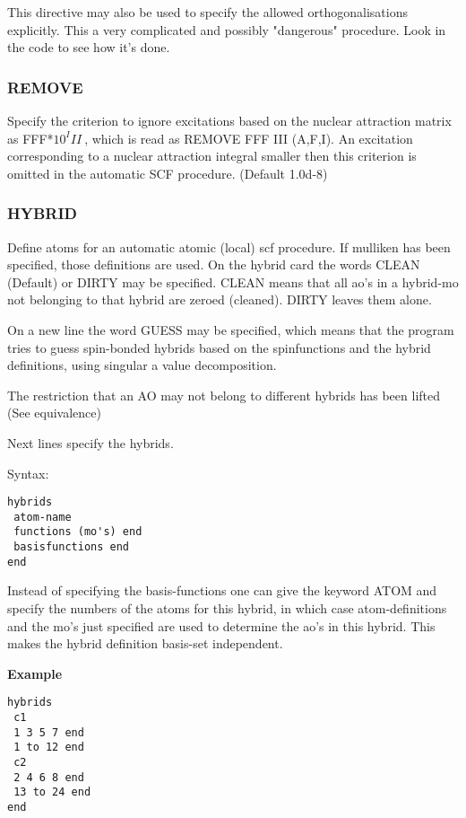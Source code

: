 \documentclass[11pt,fleqn]{article}
\begin{document}
This directive may also be used to specify the allowed orthogonalisations 
explicitly. This a very complicated and possibly "dangerous" procedure.
Look in the code to see how it's done.


\subsubsection{REMOVE}

Specify the criterion to ignore excitations based on the nuclear attraction
matrix as FFF*$10^III~$, which is read as REMOVE FFF III (A,F,I).
An excitation corresponding to a nuclear attraction integral smaller then
this criterion is omitted in the automatic SCF procedure. (Default 1.0d-8)

\subsubsection{HYBRID}

Define atoms for an automatic atomic (local) scf procedure.  If mulliken has been
specified, those definitions are used.
On the hybrid card the words CLEAN (Default) or DIRTY may be specified. 
CLEAN means that all ao's in a hybrid-mo not belonging to that hybrid 
are zeroed (cleaned). DIRTY leaves them alone.

On a new line the word GUESS may be specified, which means that
the program tries to guess spin-bonded hybrids based on the spinfunctions
and the hybrid definitions, using singular a value decomposition.

The restriction that an AO may not belong to different hybrids has been lifted (See equivalence)

Next lines specify the hybrids.

Syntax: 

\begin{verbatim}
hybrids
 atom-name 
 functions (mo's) end
 basisfunctions end
end
\end{verbatim}

Instead of specifying the basis-functions one can give the keyword ATOM
and specify the numbers of the atoms for this hybrid,
in which case atom-definitions and the mo's just specified are used
to determine the ao's in this hybrid. This makes the hybrid definition
basis-set independent.


{\bf Example }
\begin{verbatim}
hybrids
 c1
 1 3 5 7 end
 1 to 12 end
 c2
 2 4 6 8 end
 13 to 24 end
end
\end{verbatim}
\end{document}
